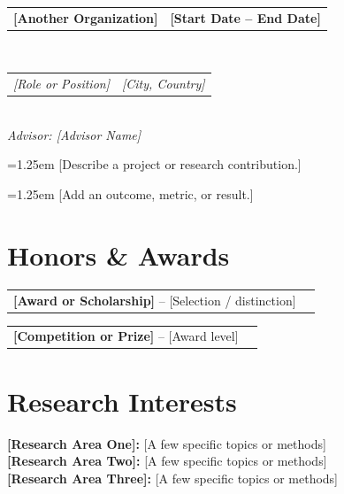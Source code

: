 \documentclass[10pt,a4paper]{article}
\makeatletter
\newcommand{\CVRow}[2]{%
  \begin{tabularx}{\linewidth}{@{}X>{\raggedleft\arraybackslash}p{.31\linewidth}@{}}#1&#2\end{tabularx}%
}
\newcommand{\CVBullet}[1]{%
  \par\hangindent=1.25em\hangafter=1\noindent
  \hspace*{.25em}\textbullet\hspace{.45em}#1\par%
}
\makeatother
\begin{document}
\CVRow{\textbf{[Another Organization]}}{\textbf{[Start Date -- End Date]}}\\[-1pt]
\CVRow{\textit{[Role or Position]}}{\textit{[City, Country]}}\\[-1pt]
\textit{Advisor: [Advisor Name]}
\CVBullet{[Describe a project or research contribution.]}
\CVBullet{[Add an outcome, metric, or result.]}

\section{Honors \& Awards}
\CVRow{\textbf{[Award or Scholarship]} -- [Selection / distinction]}{[Year]}
\CVRow{\textbf{[Competition or Prize]} -- [Award level]}{[Month Year]}

\section{Research Interests}
\textbf{[Research Area One]:} [A few specific topics or methods]\\
\textbf{[Research Area Two]:} [A few specific topics or methods]\\
\textbf{[Research Area Three]:} [A few specific topics or methods]
\end{document}

